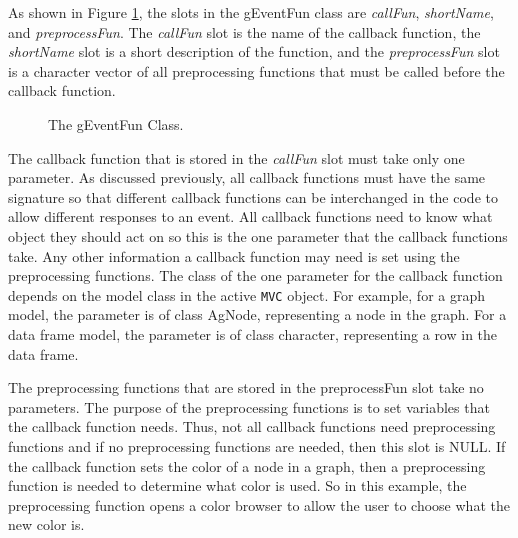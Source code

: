 \documentclass{article}[11pt]
\newcommand{\Robject}[1]{{\texttt{#1}}}
\newcommand{\Rslot}[1]{\textsl{#1}}
\newcommand{\Rclass}[1]{\textsf{#1}}
\begin{document}
As shown in Figure \ref{Fig:EventFun}, the slots in the \Rclass{gEventFun}
class are \Rslot{callFun}, \Rslot{shortName}, and \Rslot{preprocessFun}.  The
\Rslot{callFun} slot is the name of the callback function, the
\Rslot{shortName} slot is a short description of the function, and the
\Rslot{preprocessFun} slot is a character vector of all preprocessing
functions that must be called before the callback function.

\begin{figure}[ht]
  \begin{center}
    \caption{ The gEventFun Class. }
    \label{Fig:EventFun}
  \end{center}
\end{figure}

The callback function that is stored in the \Rslot{callFun} slot must take
only one parameter.  As discussed previously, all callback functions must have
the same signature so that different callback functions can be interchanged in
the code to allow different responses to an event.  All callback functions
need to know what object they should act on so this is the one
parameter that the callback functions take.  Any other information a callback
function may need is set using the preprocessing functions.  The class of
the one parameter for the callback function depends on the model class in
the active \Robject{MVC} object.  For example, for a graph model, the
parameter is of class \Rclass{AgNode}, representing a node in the graph.  For
a data frame model, the parameter is of class \Rclass{character}, representing
a row in the data frame. 

The preprocessing functions that are stored in the preprocessFun slot
take no parameters.  The purpose of the preprocessing functions is to set
variables that the callback function needs.  Thus, not all callback
functions need preprocessing functions and if no preprocessing functions
are needed, then this slot is NULL.  If the callback function sets the
color of a node in a graph, then a preprocessing function is needed to
determine what color is used.  So in this example, the preprocessing
function opens a color browser to allow the user to choose what the new
color is.
\end{document}

